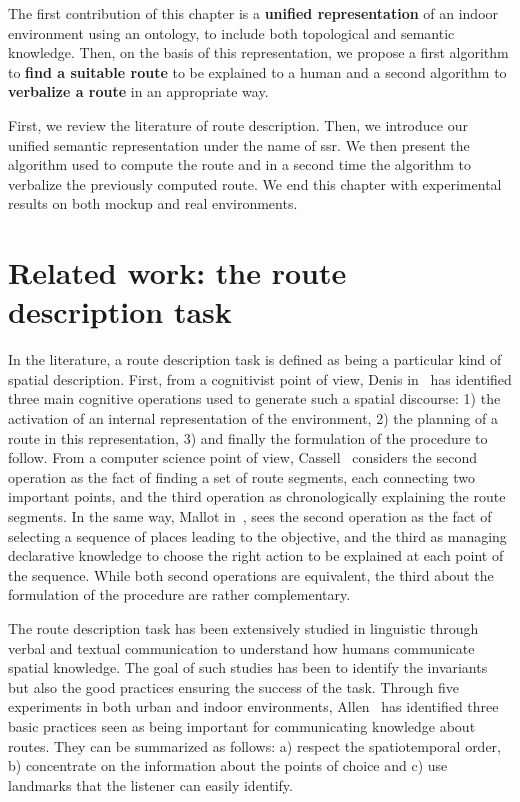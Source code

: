 The first contribution of this chapter is a \textbf{unified representation} of an indoor environment using an ontology, to include both topological and semantic knowledge. Then, on the basis of this representation, we propose a first algorithm to \textbf{find a suitable route} to be explained to a human and a second algorithm to \textbf{verbalize a route} in an appropriate way.

First, we review the literature of route description. Then, we introduce our unified semantic representation under the name of \acrfull{ssr}. We then present the algorithm used to compute the route and in a second time the algorithm to verbalize the previously computed route. We end this chapter with experimental results on both mockup and real environments.

\section[Related work]{Related work: the route description task}


In the literature, a route description task is defined as being a particular kind of spatial description. First, from a cognitivist point of view, Denis in~\cite{denis_1997_description} has identified three main cognitive operations used to generate such a spatial discourse: 1) the activation of an internal representation of the environment, 2) the planning of a route in this representation, 3) and finally the formulation of the procedure to follow. From a computer science point of view, Cassell~\cite{cassell_2007_trading} considers the second operation as the fact of finding a set of route segments, each connecting two important points, and the third operation as chronologically explaining the route segments. In the same way, Mallot in~\cite{mallot_2009_embodied}, sees the second operation as the fact of selecting a sequence of places leading to the objective, and the third as managing declarative knowledge to choose the right action to be explained at each point of the sequence. While both second operations are equivalent, the third about the formulation of the procedure are rather complementary.

The route description task has been extensively studied in linguistic through verbal and textual communication to understand how humans communicate spatial knowledge. The goal of such studies has been to identify the invariants but also the good practices ensuring the success of the task. Through five experiments in both urban and indoor environments, Allen~\cite{allen_2000_principles} has identified three basic practices seen as being important for communicating knowledge about routes. They can be summarized as follows: a) respect the spatiotemporal order, b) concentrate on the information about the points of choice and c) use landmarks that the listener can easily identify.

